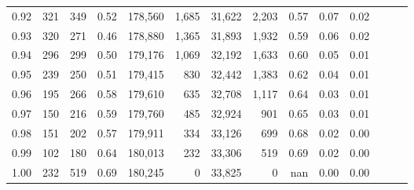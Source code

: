 \begin{tabular}{rrrrrrrrrrrrrr}
0.92 &    321 &  349 &  0.52 &  178,560 &    1,685 &  31,622 &   2,203 &  0.57 &  0.07 &      0.02 \\
0.93 &    320 &  271 &  0.46 &  178,880 &    1,365 &  31,893 &   1,932 &  0.59 &  0.06 &      0.02 \\
0.94 &    296 &  299 &  0.50 &  179,176 &    1,069 &  32,192 &   1,633 &  0.60 &  0.05 &      0.01 \\
0.95 &    239 &  250 &  0.51 &  179,415 &      830 &  32,442 &   1,383 &  0.62 &  0.04 &      0.01 \\
0.96 &    195 &  266 &  0.58 &  179,610 &      635 &  32,708 &   1,117 &  0.64 &  0.03 &      0.01 \\
0.97 &    150 &  216 &  0.59 &  179,760 &      485 &  32,924 &     901 &  0.65 &  0.03 &      0.01 \\
0.98 &    151 &  202 &  0.57 &  179,911 &      334 &  33,126 &     699 &  0.68 &  0.02 &      0.00 \\
0.99 &    102 &  180 &  0.64 &  180,013 &      232 &  33,306 &     519 &  0.69 &  0.02 &      0.00 \\
1.00 &    232 &  519 &  0.69 &  180,245 &        0 &  33,825 &       0 &   nan &  0.00 &      0.00 \\
\bottomrule
\end{tabular}
